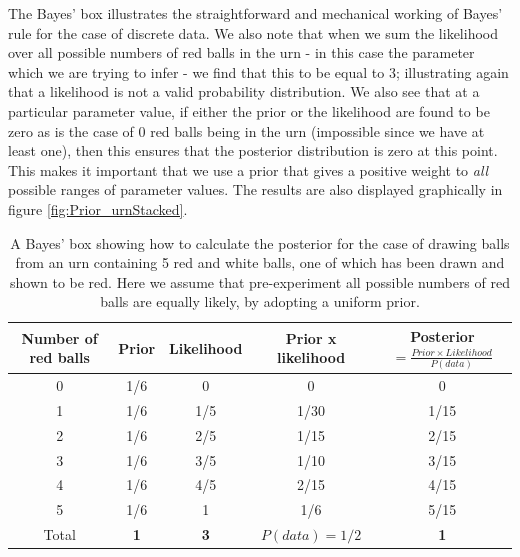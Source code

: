 \documentclass[11pt,fullpage]{book}
\begin{document}
The Bayes' box illustrates the straightforward and mechanical working of Bayes' rule for the case of discrete data. We also note that when we sum the likelihood over all possible numbers of red balls in the urn - in this case the parameter which we are trying to infer - we find that this to be equal to 3; illustrating again that a likelihood is not a valid probability distribution. We also see that at a particular parameter value, if either the prior or the likelihood are found to be zero as is the case of 0 red balls being in the urn (impossible since we have at least one), then this ensures that the posterior distribution is zero at this point. This makes it important that we use a prior that gives a positive weight to \textit{all} possible ranges of parameter values. The results are also displayed graphically in figure \ref{fig:Prior_urnStacked}.

\begin{table}[htbp]
  \centering
  \caption{A Bayes' box showing how to calculate the posterior for the case of drawing balls from an urn containing 5 red and white balls, one of which has been drawn and shown to be red. Here we assume that pre-experiment all possible numbers of red balls are equally likely, by adopting a uniform prior.}\label{tab:Prior_bayesBoxDiscreteUrns}
    \begin{tabular}{ccccc}
    \toprule
    \textbf{Number of red balls} & \textbf{Prior} & \textbf{Likelihood} & \textbf{Prior x likelihood} & \textbf{Posterior$=\frac{Prior\times Likelihood}{P(data)}$} \\
    \midrule
    0     &  1/6  & 0     & 0       & 0       \\
    1     &  1/6  &  1/5  &   1/30 &   1/15 \\
    2     &  1/6  &  2/5  &   1/15 &   2/15 \\
    3     &  1/6  &  3/5  &   1/10 &   3/15  \\
    4     &  1/6  &  4/5  &   2/15 &   4/15 \\
    5     &  1/6  & 1     &   1/6  &   5/15  \\
    \bottomrule
    Total & \textbf{1    } & \textbf{3    } & \textbf{$P(data)=1/2$ } & \textbf{1      } \\
    \bottomrule
    \end{tabular}%
  \label{tab:addlabel}%
\end{table}%
\end{document}
